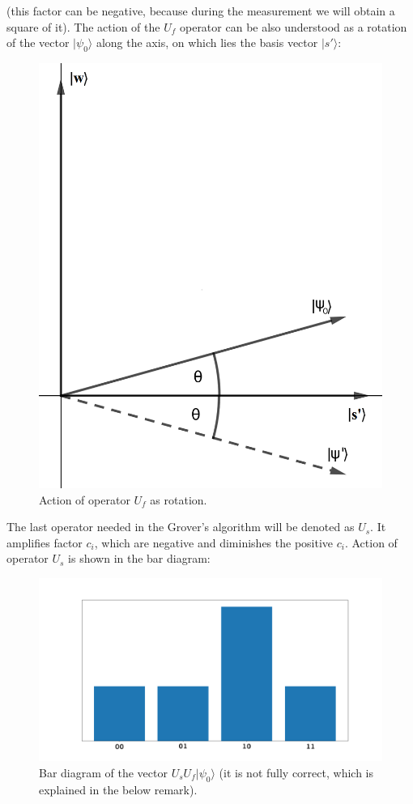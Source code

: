 \newpage
(this factor can be negative, because during the measurement we will obtain a square of it). The action of the $U_f$ operator can be also understood as a rotation of the vector $|\psi_0\rangle$ along the axis, on which lies the basis vector $|s'\rangle$:

\begin{figure}[ht]
\centering
\includegraphics[scale=0.2]{grover_2}
\caption{Action of operator $U_f$ as rotation.}
\end{figure}

The last operator needed in the Grover's algorithm will be denoted as $U_s$. It amplifies factor $c_i$, which are negative and diminishes the positive $c_i$. Action of operator $U_s$ is shown in the bar diagram:

\newpage
\begin{figure}[ht]
\centering
\includegraphics[scale=0.25]{grover_bars_3.png}
\caption{Bar diagram of the vector $U_sU_f|\psi_0\rangle$ (it is not fully correct, which is explained in the below remark).}
\label{grover_bars_3}
\end{figure}

